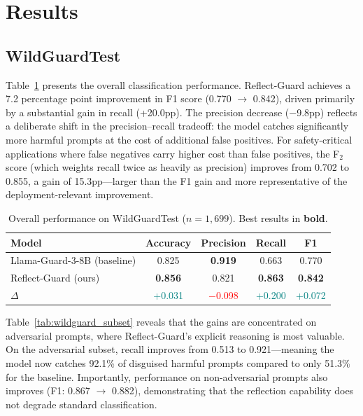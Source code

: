 \documentclass[11pt]{article}
\begin{document}
\section{Results}

\subsection{WildGuardTest}

Table~\ref{tab:wildguard_main} presents the overall classification performance. Reflect-Guard achieves a 7.2 percentage point improvement in F1 score (0.770 $\to$ 0.842), driven primarily by a substantial gain in recall (+20.0pp). The precision decrease ($-$9.8pp) reflects a deliberate shift in the precision--recall tradeoff: the model catches significantly more harmful prompts at the cost of additional false positives. For safety-critical applications where false negatives carry higher cost than false positives, the F$_2$ score (which weights recall twice as heavily as precision) improves from 0.702 to 0.855, a gain of 15.3pp---larger than the F1 gain and more representative of the deployment-relevant improvement.

\begin{table}[t]
  \caption{Overall performance on WildGuardTest ($n = 1{,}699$). Best results in \textbf{bold}.}
  \label{tab:wildguard_main}
  \centering
  \begin{tabular}{lcccc}
    \toprule
    Model & Accuracy & Precision & Recall & F1 \\
    \midrule
    Llama-Guard-3-8B (baseline) & 0.825 & \textbf{0.919} & 0.663 & 0.770 \\
    Reflect-Guard (ours) & \textbf{0.856} & 0.821 & \textbf{0.863} & \textbf{0.842} \\
    \midrule
    $\Delta$ & \textcolor{teal}{+0.031} & \textcolor{red}{$-$0.098} & \textcolor{teal}{+0.200} & \textcolor{teal}{+0.072} \\
    \bottomrule
  \end{tabular}
\end{table}

Table~\ref{tab:wildguard_subset} reveals that the gains are concentrated on adversarial prompts, where Reflect-Guard's explicit reasoning is most valuable. On the adversarial subset, recall improves from 0.513 to 0.921---meaning the model now catches 92.1\% of disguised harmful prompts compared to only 51.3\% for the baseline. Importantly, performance on non-adversarial prompts also improves (F1: 0.867 $\to$ 0.882), demonstrating that the reflection capability does not degrade standard classification.
\end{document}
